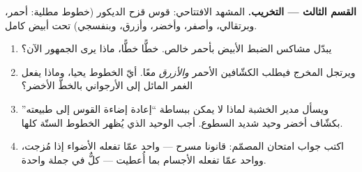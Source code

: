 \begin{problem}
\medskip\noindent\textbf{القسم الثالث --- التخريب.}
المشهد الافتتاحي: قوس قزح الديكور (خطوط مطلية: أحمر، وبرتقالي،
وأصفر، وأخضر، وأزرق، وبنفسجي) تحت  أبيض كامل.
\begin{enumerate}[resume]
  \item يبدّل مشاكس الضبط الأبيض بأحمر خالص. خطًّا خطًّا، ماذا
        يرى الجمهور الآن؟
  \item ويرتجل المخرج فيطلب الكشّافين الأحمر \emph{والأزرق}
        معًا. أيّ الخطوط يحيا، وماذا يفعل الغمر المائل إلى
        الأرجواني بالخطّ الأخضر؟
  \item ويسأل مدير الخشبة لماذا لا يمكن ببساطة ``إعادة إضاءة
        القوس إلى طبيعته'' بكشّاف أخضر وحيد شديد السطوع. أجب
         الوحيد الذي يُظهر الخطوط الستّة كلها.
  \item اكتب جواب امتحان المصمّم: قانونا مسرح  ---
        واحد عمّا تفعله الأضواء إذا مُزجت، وواحد عمّا تفعله
        الأجسام بما أُعطيت --- كلٌّ في جملة واحدة.
\end{enumerate}
\end{problem}
